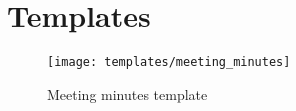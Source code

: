 \section{Templates}


\begin{figure}[!htb]
\centering
\texttt{[image: templates/meeting\_minutes]}
\caption{Meeting minutes template}
\label{fig:meeting_minutes}
\end{figure}

